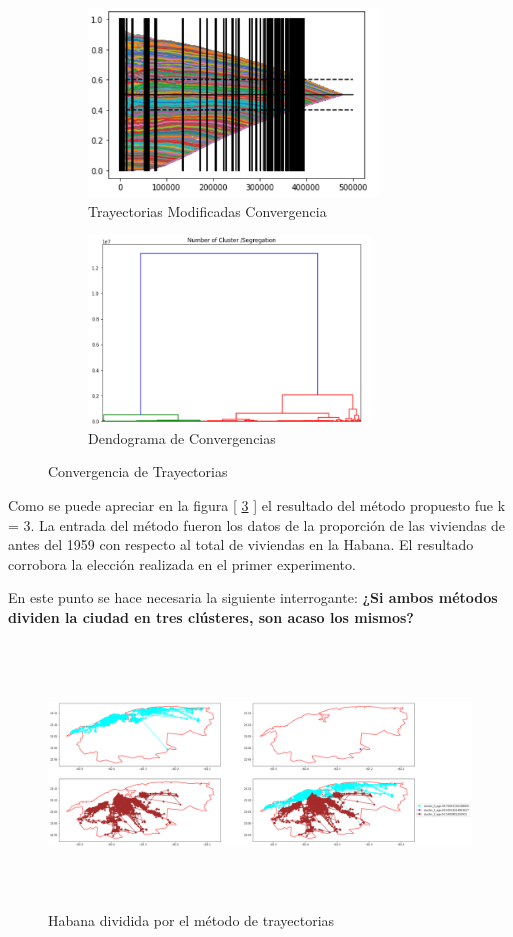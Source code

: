 \begin{figure}[h!]
	\centering
	\begin{subfigure}[b]{0.6\linewidth}
		\includegraphics[width=\linewidth, height=5cm]{Images/Convergency2.png}
		\caption{Trayectorias Modificadas Convergencia}
		\label{fig:Convergency2}
	\end{subfigure}
	\begin{subfigure}[b]{0.6\linewidth}
		\includegraphics[width=\linewidth, height=5cm]{Images/ConvergenciaTrayec.png}
		\caption{Dendograma de Convergencias}
		\label{fig:ConvergenciaTrayec}
	\end{subfigure}
	
	\caption{Convergencia de Trayectorias}
	\label{fig:TrayectoriasConV}
\end{figure}

Como se puede apreciar en la figura [ \ref{fig:TrayectoriasConV} ] el resultado del método propuesto fue k = 3. La entrada del método fueron los datos de la proporción de las viviendas de antes del 1959 con respecto al total de viviendas en la Habana. El resultado corrobora la elección realizada en el primer experimento.

En este punto se hace necesaria la siguiente interrogante: \textbf{¿Si ambos métodos dividen la ciudad en tres clústeres, son acaso los mismos?}

\begin{figure}[h!]
	\centering
	\includegraphics[width=15cm, height=7cm]{Images/Hab3KTrayec.png}
	\caption{Habana dividida por el método de trayectorias}
	\label{fig:Hab3KTrayec}
\end{figure}

